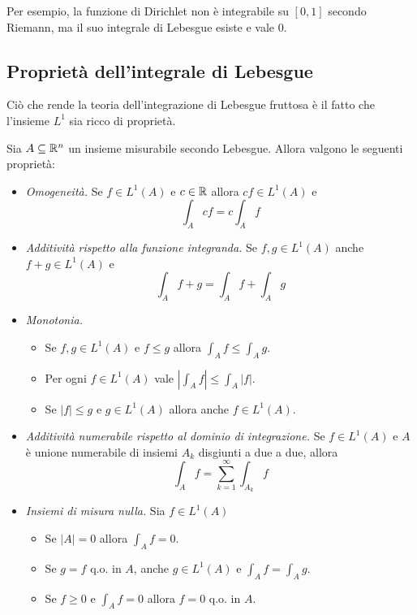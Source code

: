 Per esempio, la funzione di Dirichlet non è integrabile su $[0,1]$ secondo Riemann, ma il suo integrale di Lebesgue esiste e vale $0$.

\newpage

\subsection{Proprietà dell'integrale di Lebesgue}

Ciò che rende la teoria dell'integrazione di Lebesgue fruttosa è il fatto che l'insieme $L^1$ sia ricco di proprietà.

\begin{thm}
Sia $A\subseteq\mathbb{R}^n$ un insieme misurabile secondo Lebesgue. Allora valgono le seguenti proprietà: 
\begin{itemize}
    \item \textit{Omogeneità.} Se $f\in L^1(A)$ e $c\in\mathbb{R}$ allora $cf\in L^1(A)$ e 
    $$
    \int_A cf = c\int_A f
    $$

    \item \textit{Additività rispetto alla funzione integranda.} Se $f,g\in L^1(A)$ anche $f+g\in L^1(A)$ e 
    $$
    \int_A f+g=\int_A f+\int_A g
    $$

    \item \textit{Monotonia.}
    \begin{itemize}
        \item Se $f,g\in L^1(A)$ e $f\leq g$ allora $\int_A f\leq \int_A g$.
        \item Per ogni $f\in L^1(A)$ vale $\left|\int_A f \right|\leq \int_A |f|$.
        \item Se $|f|\leq g$ e $g\in L^1(A)$ allora anche $f\in L^1(A)$.
    \end{itemize}

    \item \textit{Additività numerabile rispetto al dominio di integrazione.} Se $f\in L^1(A)$ e $A$ è unione numerabile di insiemi $A_k$ disgiunti a due a due, allora 
    $$
    \int_A f =\sum_{k=1}^{\infty}\int_{A_k} f
    $$

    \item \textit{Insiemi di misura nulla.} Sia $f\in L^1(A)$
    \begin{itemize}
        \item Se $|A|=0$ allora $\int_A f=0$.
        \item Se $g=f$ q.o. in $A$, anche $g\in L^1(A)$ e $\int_A f=\int_A g$.
        \item Se $f\geq 0$ e $\int_A f=0$ allora $f=0$ q.o. in $A$.    
    \end{itemize}
\end{itemize}
\end{thm}

